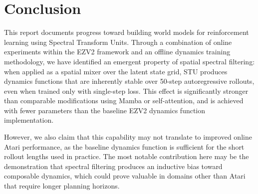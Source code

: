 \documentclass[10pt,twocolumn]{IEEEtran}
\begin{document}
\section{Conclusion}
\label{sec:conclusion}

This report documents progress toward building world models for reinforcement learning using Spectral Transform Units. Through a combination of online experiments within the EZV2 framework and an offline dynamics training methodology, we have identified an emergent property of spatial spectral filtering: when applied as a spatial mixer over the latent state grid, STU produces dynamics functions that are inherently stable over 50-step autoregressive rollouts, even when trained only with single-step loss. This effect is significantly stronger than comparable modifications using Mamba or self-attention, and is achieved with fewer parameters than the baseline EZV2 dynamics function implementation.

However, we also claim that this capability may not translate to improved online Atari performance, as the baseline dynamics function is sufficient for the short rollout lengths used in practice. The most notable contribution here may be the demonstration that spectral filtering produces an inductive bias toward composable dynamics, which could prove valuable in domains other than Atari that require longer planning horizons.



\end{document}
